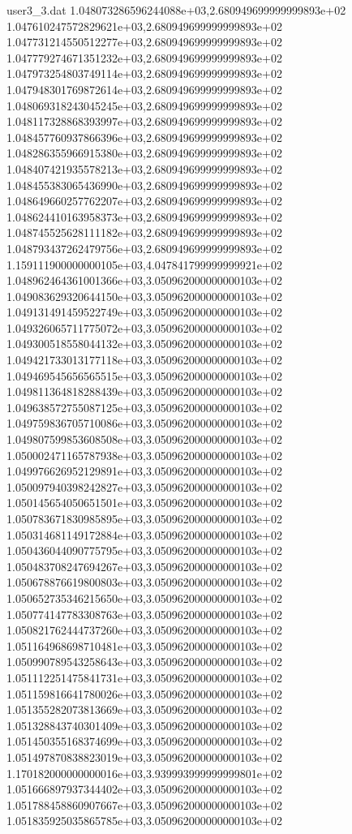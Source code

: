 \begin{filecontents}{user3_3.dat}
1.048073286596244088e+03,2.680949699999999893e+02
1.047610247572829621e+03,2.680949699999999893e+02
1.047731214550512277e+03,2.680949699999999893e+02
1.047779274671351232e+03,2.680949699999999893e+02
1.047973254803749114e+03,2.680949699999999893e+02
1.047948301769872614e+03,2.680949699999999893e+02
1.048069318243045245e+03,2.680949699999999893e+02
1.048117328868393997e+03,2.680949699999999893e+02
1.048457760937866396e+03,2.680949699999999893e+02
1.048286355966915380e+03,2.680949699999999893e+02
1.048407421935578213e+03,2.680949699999999893e+02
1.048455383065436990e+03,2.680949699999999893e+02
1.048649660257762207e+03,2.680949699999999893e+02
1.048624410163958373e+03,2.680949699999999893e+02
1.048745525628111182e+03,2.680949699999999893e+02
1.048793437262479756e+03,2.680949699999999893e+02
1.159111900000000105e+03,4.047841799999999921e+02
1.048962464361001366e+03,3.050962000000000103e+02
1.049083629320644150e+03,3.050962000000000103e+02
1.049131491459522749e+03,3.050962000000000103e+02
1.049326065711775072e+03,3.050962000000000103e+02
1.049300518558044132e+03,3.050962000000000103e+02
1.049421733013177118e+03,3.050962000000000103e+02
1.049469545656565515e+03,3.050962000000000103e+02
1.049811364818288439e+03,3.050962000000000103e+02
1.049638572755087125e+03,3.050962000000000103e+02
1.049759836705710086e+03,3.050962000000000103e+02
1.049807599853608508e+03,3.050962000000000103e+02
1.050002471165787938e+03,3.050962000000000103e+02
1.049976626952129891e+03,3.050962000000000103e+02
1.050097940398242827e+03,3.050962000000000103e+02
1.050145654050651501e+03,3.050962000000000103e+02
1.050783671830985895e+03,3.050962000000000103e+02
1.050314681149172884e+03,3.050962000000000103e+02
1.050436044090775795e+03,3.050962000000000103e+02
1.050483708247694267e+03,3.050962000000000103e+02
1.050678876619800803e+03,3.050962000000000103e+02
1.050652735346215650e+03,3.050962000000000103e+02
1.050774147783308763e+03,3.050962000000000103e+02
1.050821762444737260e+03,3.050962000000000103e+02
1.051164968698710481e+03,3.050962000000000103e+02
1.050990789543258643e+03,3.050962000000000103e+02
1.051112251475841731e+03,3.050962000000000103e+02
1.051159816641780026e+03,3.050962000000000103e+02
1.051355282073813669e+03,3.050962000000000103e+02
1.051328843740301409e+03,3.050962000000000103e+02
1.051450355168374699e+03,3.050962000000000103e+02
1.051497870838823019e+03,3.050962000000000103e+02
1.170182000000000016e+03,3.939993999999999801e+02
1.051666897937344402e+03,3.050962000000000103e+02
1.051788458860907667e+03,3.050962000000000103e+02
1.051835925035865785e+03,3.050962000000000103e+02

\end{filecontents}

